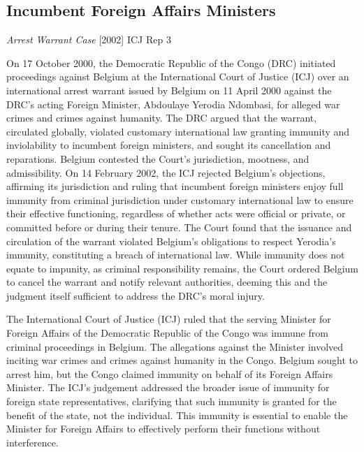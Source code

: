 \subsection{Incumbent Foreign Affairs Ministers}
\begin{casedetails}{\textit{Arrest Warrant Case} [2002] ICJ Rep 3}
    \flushleft

    On 17 October 2000, the Democratic Republic of the Congo (DRC) initiated proceedings against Belgium at the International Court of Justice (ICJ) over an international arrest warrant issued by Belgium on 11 April 2000 against the DRC's acting Foreign Minister, Abdoulaye Yerodia Ndombasi, for alleged war crimes and crimes against humanity. The DRC argued that the warrant, circulated globally, violated customary international law granting immunity and inviolability to incumbent foreign ministers, and sought its cancellation and reparations. Belgium contested the Court's jurisdiction, mootness, and admissibility. On 14 February 2002, the ICJ rejected Belgium's objections, affirming its jurisdiction and ruling that incumbent foreign ministers enjoy full immunity from criminal jurisdiction under customary international law to ensure their effective functioning, regardless of whether acts were official or private, or committed before or during their tenure. The Court found that the issuance and circulation of the warrant violated Belgium's obligations to respect Yerodia's immunity, constituting a breach of international law. While immunity does not equate to impunity, as criminal responsibility remains, the Court ordered Belgium to cancel the warrant and notify relevant authorities, deeming this and the judgment itself sufficient to address the DRC's moral injury.

    \tcblower
    \flushleft

    The International Court of Justice (ICJ) ruled that the serving Minister for Foreign Affairs of the Democratic Republic of the Congo was immune from criminal proceedings in Belgium. The allegations against the Minister involved inciting war crimes and crimes against humanity in the Congo. Belgium sought to arrest him, but the Congo claimed immunity on behalf of its Foreign Affairs Minister. The ICJ's judgement addressed the broader issue of immunity for foreign state representatives, clarifying that such immunity is granted for the benefit of the state, not the individual. This immunity is essential to enable the Minister for Foreign Affairs to effectively perform their functions without interference.


\end{casedetails}
